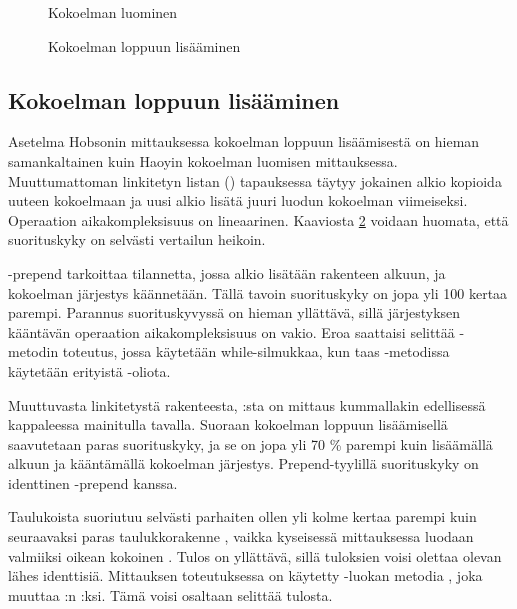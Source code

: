 \begin{figure}[h]
    \centering
    
    \caption{Kokoelman luominen}\label{kokoelmanLuominen_kaavio}
\end{figure}


\begin{figure}[h]
    \centering
    
    \caption{Kokoelman loppuun lisääminen}\label{kokoelmanLoppuunLisaaminen_kaavio}
\end{figure}

\subsection{Kokoelman loppuun lisääminen}
Asetelma Hobsonin mittauksessa\cite{hobsonBenchmark} kokoelman loppuun lisäämisestä on hieman samankaltainen kuin Haoyin\cite{haoyiBenchmark} kokoelman luomisen mittauksessa. Muuttumattoman linkitetyn listan () tapauksessa täytyy jokainen alkio kopioida uuteen kokoelmaan ja uusi alkio lisätä juuri luodun kokoelman viimeiseksi. Operaation aikakompleksisuus on lineaarinen. Kaaviosta \ref{kokoelmanLoppuunLisaaminen_kaavio} voidaan huomata, että suorituskyky on selvästi vertailun heikoin.

-prepend tarkoittaa tilannetta, jossa alkio lisätään rakenteen alkuun, ja kokoelman järjestys käännetään. Tällä tavoin suorituskyky on jopa yli 100 kertaa parempi. Parannus suorituskyvyssä on hieman yllättävä, sillä järjestyksen kääntävän operaation aikakompleksisuus on vakio. Eroa saattaisi selittää -metodin toteutus, jossa käytetään while-silmukkaa, kun taas \code{:+}-metodissa käytetään erityistä -oliota.

Muuttuvasta linkitetystä rakenteesta, :sta on mittaus kummallakin edellisessä kappaleessa mainitulla tavalla. Suoraan kokoelman loppuun lisäämisellä saavutetaan paras suorituskyky, ja se on jopa yli 70 \% parempi kuin lisäämällä alkuun ja kääntämällä kokoelman järjestys. Prepend-tyylillä suorituskyky on identtinen -prepend kanssa. 

Taulukoista  suoriutuu selvästi parhaiten ollen yli kolme kertaa parempi kuin seuraavaksi paras taulukkorakenne , vaikka kyseisessä mittauksessa luodaan valmiiksi oikean kokoinen . Tulos on yllättävä, sillä tuloksien voisi olettaa olevan lähes identtisiä. Mittauksen \cite{hobsonBenchmark} toteutuksessa on käytetty -luokan metodia , joka muuttaa :n :ksi. Tämä voisi osaltaan selittää tulosta.


